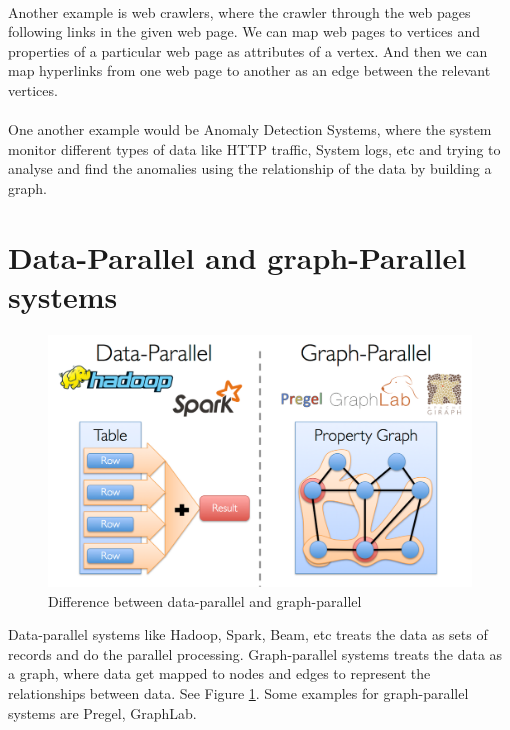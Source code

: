 \documentclass[12pt]{report}
\numberwithin{figure}{section}
\numberwithin{table}{section}
\begin{document}
\paragraph{}

Another example is web crawlers, where the crawler through the web pages following links in the given web page. We can map web pages to vertices and properties of a particular web page as attributes of a vertex. And then we can map hyperlinks from one web page to another as an edge between the relevant vertices.  

\paragraph{}

One another example would be Anomaly  Detection Systems, where the system monitor different types of data like HTTP traffic, System logs, etc and trying to analyse and find the anomalies using the relationship of the data by building a graph.

\section{Data-Parallel and graph-Parallel systems}

\begin{figure}[H]
\centering
\includegraphics[scale=0.3]{images/image00}
\caption{Difference between data-parallel and graph-parallel}
\label{fig:parallel}
\end{figure}

Data-parallel systems like Hadoop, Spark, Beam, etc treats the data as sets of records and do the parallel processing. Graph-parallel systems treats the data as a graph, where data get mapped to nodes and edges to represent the relationships between data. See Figure \ref{fig:parallel}. Some examples for graph-parallel systems are Pregel, GraphLab.
\end{document}
